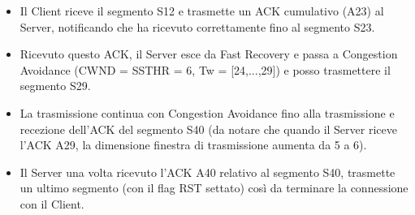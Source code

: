 \documentclass[10pt,a4paper]{article}
\begin{document}
\begin{enumerate}
\begin{itemize}
		\item Il Client riceve il segmento S12 e trasmette un ACK cumulativo (A23) al Server, notificando che ha ricevuto correttamente fino al segmento S23.
		\item Ricevuto questo ACK, il Server esce da Fast Recovery e passa a Congestion Avoidance (CWND = SSTHR = 6, Tw = [24,...,29]) e posso trasmettere il segmento S29.
		\item La trasmissione continua con Congestion Avoidance fino alla trasmissione e recezione dell'ACK del segmento S40 (da notare che quando il Server riceve l'ACK A29, la dimensione finestra di trasmissione aumenta da 5 a 6).
		\item Il Server una volta ricevuto l'ACK A40 relativo al segmento S40, trasmette un ultimo segmento (con il flag RST settato) così da terminare la connessione con il Client.
	\end{itemize}
	\newpage
	\begin{figure}[H]
		\begin{subfigure}[b]{9cm}

\end{subfigure}
\end{figure}
\end{enumerate}
\end{document}
